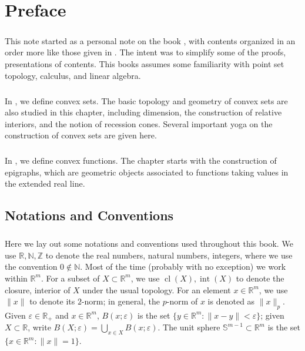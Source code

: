 \chapter*{Preface}

\paragraph{}This note started as a personal note on the book \cite{bertsekas2009convex}, with contents organized in an order more like those given in \cite{rockafellar+1970}. The intent was to simplify some of the proofs, presentations of contents. This books assumes some familiarity with point set topology, calculus, and linear algebra.

\paragraph{}In , we define convex sets. The basic topology and geometry of convex sets are also studied in this chapter, including dimension, the construction of relative interiors, and the notion of recession cones. Several important yoga on the construction of convex sets are given here.

\paragraph{}In , we define convex functions. The chapter starts with the construction of epigraphs, which are geometric objects associated to functions taking values in the extended real line.

\section*{Notations and Conventions}

\paragraph{}Here we lay out some notations and conventions used throughout this book. We use $\mathbb{R,N,Z}$ to denote the real numbers, natural numbers, integers, where we use the convention $0\notin \mathbb{N}$. Most of the time (probably with no exception) we work within $\mathbb{R}^m$. For a subset of $X\subset \mathbb{R}^m$, we use $\operatorname{cl}(X),\operatorname{int}(X)$ to denote the closure, interior of $X$ under the usual topology. For an element $x\in \mathbb{R}^m$, we use $\|x\|$ to denote its $2$-norm; in general, the $p$-norm of $x$ is denoted as $\|x\|_p$. Given $\varepsilon \in \mathbb{R}_{+}$ and $x\in \mathbb{R}^m$, $B(x;\varepsilon )$ is the set $\{y\in \mathbb{R}^m:\|x-y\|<\varepsilon \}$; given $X\subset \mathbb{R}$, write $B(X;\varepsilon )=\bigcup_{x\in X}B(x;\varepsilon )$. The unit sphere $\mathbb{S}^{m-1}\subset \mathbb{R}^m$ is the set $\{x\in \mathbb{R}^m:\|x\|=1\}$.


